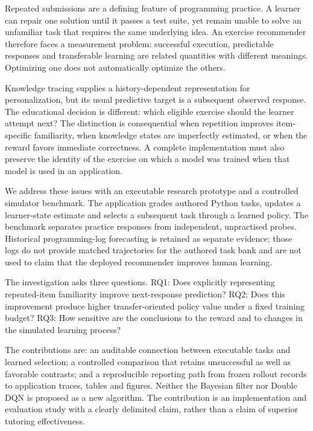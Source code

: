 \documentclass[preprint,11pt,authoryear]{elsarticle}
\begin{document}
Repeated submissions are a defining feature of programming practice. A learner can repair one solution until it passes a test suite, yet remain unable to solve an unfamiliar task that requires the same underlying idea. An exercise recommender therefore faces a measurement problem: successful execution, predictable responses and transferable learning are related quantities with different meanings. Optimizing one does not automatically optimize the others.

Knowledge tracing supplies a history-dependent representation for personalization, but its usual predictive target is a subsequent observed response. The educational decision is different: which eligible exercise should the learner attempt next? The distinction is consequential when repetition improves item-specific familiarity, when knowledge states are imperfectly estimated, or when the reward favors immediate correctness. A complete implementation must also preserve the identity of the exercise on which a model was trained when that model is used in an application.

We address these issues with an executable research prototype and a controlled simulator benchmark. The application grades authored Python tasks, updates a learner-state estimate and selects a subsequent task through a learned policy. The benchmark separates practice responses from independent, unpractised probes. Historical programming-log forecasting is retained as separate evidence; those logs do not provide matched trajectories for the authored task bank and are not used to claim that the deployed recommender improves human learning.

The investigation asks three questions. RQ1: Does explicitly representing repeated-item familiarity improve next-response prediction? RQ2: Does this improvement produce higher transfer-oriented policy value under a fixed training budget? RQ3: How sensitive are the conclusions to the reward and to changes in the simulated learning process?

The contributions are: an auditable connection between executable tasks and learned selection; a controlled comparison that retains unsuccessful as well as favorable contrasts; and a reproducible reporting path from frozen rollout records to application traces, tables and figures. Neither the Bayesian filter nor Double DQN is proposed as a new algorithm. The contribution is an implementation and evaluation study with a clearly delimited claim, rather than a claim of superior tutoring effectiveness.
\end{document}
